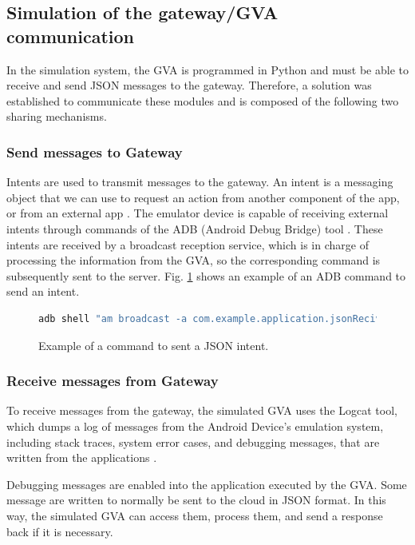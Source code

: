 \documentclass[journal]{IEEEtran}	%
\begin{document}
\subsection{Simulation of the gateway/GVA communication}
\label{sec:Gateway-GVA}


In the simulation system, the GVA is programmed in Python and must be able to receive and send JSON messages to the gateway. Therefore, a solution was established to communicate these modules and is composed of the following two sharing mechanisms.


\subsubsection{Send messages to Gateway}


Intents are used to transmit messages to the gateway. An intent is a messaging object that we can use to request an action from another component of the app, or from an external app \cite{Intents}. The emulator device is capable of receiving external intents through commands of the ADB (Android Debug Bridge) tool \cite{ADB}. These intents are received by a broadcast reception service, which is in charge of processing the information from the GVA, so the corresponding command is subsequently sent to the server. Fig.  \ref{fig:sendIntent} shows an example of an ADB command to send an intent.

\begin{figure}[t!]
\centering
\begin{lstlisting}[language=bash]
    adb shell "am broadcast -a com.example.application.jsonReciver --es JSON "{ "name": "Robert", "age": 52, "address": "Cra. 35 #15-22", "pets": ["Tasha","Molly","Blast"] }" "
\end{lstlisting}
\caption{Example of a command to sent a JSON intent.}
\label{fig:sendIntent}
\end{figure}


\subsubsection{Receive messages from Gateway}


To receive messages from the gateway, the simulated GVA uses the Logcat tool, which dumps a log of messages from the Android Device's emulation system, including stack traces, system error cases, and debugging messages, that are written from the applications \cite{Logcat}.

Debugging messages are enabled into the application executed by the GVA. Some message are written to normally be sent to the cloud in JSON format. In this way, the simulated GVA can access them, process them, and send a response back if it is necessary.
\end{document}
